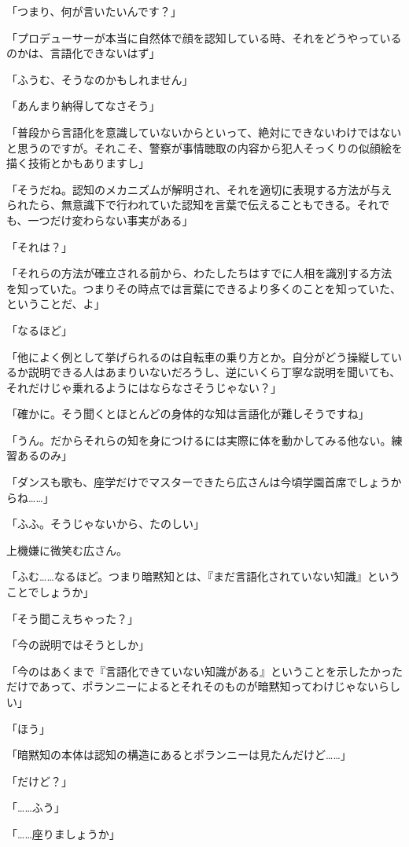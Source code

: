 \documentclass[paper=b5j]{jlreq}
\begin{document}
「つまり、何が言いたいんです？」

「プロデューサーが本当に自然体で顔を認知している時、それをどうやっているのかは、言語化できないはず」

「ふうむ、そうなのかもしれません」

「あんまり納得してなさそう」

「普段から言語化を意識していないからといって、絶対にできないわけではないと思うのですが。それこそ、警察が事情聴取の内容から犯人そっくりの似顔絵を描く技術とかもありますし」

「そうだね。認知のメカニズムが解明され、それを適切に表現する方法が与えられたら、無意識下で行われていた認知を言葉で伝えることもできる。それでも、一つだけ変わらない事実がある」

「それは？」

「それらの方法が確立される前から、わたしたちはすでに人相を識別する方法を知っていた。つまりその時点では言葉にできるより多くのことを知っていた、ということだ、よ\cite[19]{polanyi1966ja}」

「なるほど」

「他によく例として挙げられるのは自転車の乗り方とか。自分がどう操縦しているか説明できる人はあまりいないだろうし、逆にいくら丁寧な説明を聞いても、それだけじゃ乗れるようにはならなさそうじゃない？」

「確かに。そう聞くとほとんどの身体的な知は言語化が難しそうですね」

「うん。だからそれらの知を身につけるには実際に体を動かしてみる他ない。練習あるのみ」

「ダンスも歌も、座学だけでマスターできたら広さんは今頃学園首席でしょうからね……」

「ふふ。そうじゃないから、たのしい」


上機嫌に微笑む広さん。

「ふむ……なるほど。つまり暗黙知とは、『まだ言語化されていない知識』ということでしょうか」

「そう聞こえちゃった？」

「今の説明ではそうとしか」

「今のはあくまで『言語化できていない知識がある』ということを示したかっただけであって、ポランニーによるとそれそのものが暗黙知ってわけじゃないらしい」

「ほう」

「暗黙知の本体は認知の構造にあるとポランニーは見たんだけど……」

「だけど？」

「……ふう」

「……座りましょうか」
\end{document}
